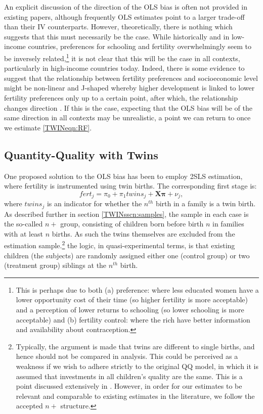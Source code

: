 An explicit discussion of the direction of the OLS bias is often not provided in 
existing papers, although frequently OLS estimates point to a larger trade-off 
than their IV counterparts. However, theoretically, there is nothing which 
suggests that this must necessarily be the case. While historically and in 
low-income countries, preferences for schooling and fertility overwhelmingly 
seem to be inversely related,\footnote{This is perhaps due to both (a) 
preference: where less educated women have a lower opportunity cost of their 
time (so higher fertility is more acceptable) and a perception of lower returns 
to schooling (so lower schooling is more acceptable) and (b) fertility control: 
where the rich have better information and availability about contraception.} 
it is not clear that this will be the case in all contexts, particularly in 
high-income countries today. Indeed, there is some evidence to suggest that the 
relationship between fertility preferences and socioeconomic level might be 
non-linear and J-shaped whereby higher development is linked to lower fertility 
preferences only up to a certain point, after which, the relationship changes 
direction \citet{Myrskylaetal2009}.  If this is the case, expecting that the OLS 
bias will be of the same direction in all contexts may be unrealistic, a point 
we can return to once we estimate \ref{TWINeqn:RF}.


\subsection{Quantity-Quality with Twins}           \label{TWINsscn:methodQQ}
One proposed solution to the OLS bias has been to employ 2SLS estimation, where 
fertility is instrumented using twin births. The corresponding first stage is:
\begin{equation}
\label{TWINeqn:firststage}
fert_{j}=\pi_0+\pi_1 twins_{j}+\bm{X}\bm{\pi}+\nu_{j},
\end{equation}
where $twins_j$ is an indicator for whether the $n^{th}$ birth in a family is a 
twin birth. As described further in section \ref{TWINsscn:samples}, the sample 
in each case is the so-called $n+$ group, consisting of children born before 
birth $n$ in families with at least $n$ births. As such the twins themselves are 
excluded from the estimation sample.\footnote{Typically, the argument is made 
that twins are different to single births, and hence should not be compared in 
analysis.  This could be perceived as a weakness if we wish to adhere strictly 
to the original QQ model, in which it is assumed that investments in all 
children's quality are the same.  This is a point discussed extensively in 
\citet{RosenzweigZhang2009}. However, in order for our estimates to be relevant 
and comparable to existing estimates in the literature, we follow the accepted
$n+$ structure.} the logic, in quasi-experimental terms, is that existing 
children (the subjects) are randomly assigned either one (control group) or two 
(treatment group) siblings at the $n^{th}$ birth.


